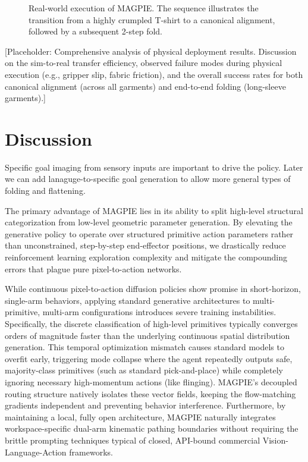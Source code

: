 \documentclass[journal]{IEEEtran}
\begin{document}
\begin{figure}[!h]
    \centering
    \caption{Real-world execution of MAGPIE. The sequence illustrates the transition from a highly crumpled T-shirt to a canonical alignment, followed by a subsequent 2-step fold.}
    \label{fig:real_world}
\end{figure}

[Placeholder: Comprehensive analysis of physical deployment results. Discussion on the sim-to-real transfer efficiency, observed failure modes during physical execution (e.g., gripper slip, fabric friction), and the overall success rates for both canonical alignment (across all garments) and end-to-end folding (long-sleeve garments).]

\section{Discussion}
\label{sec:discussion}

Specific goal imaging from sensory inputs are important to drive the policy. Later we can add lanaguge-to-specific goal generation to allow more general types of folding and flattening.  

The primary advantage of MAGPIE lies in its ability to split high-level structural categorization from low-level geometric parameter generation. By elevating the generative policy to operate over structured primitive action parameters rather than unconstrained, step-by-step end-effector positions, we drastically reduce reinforcement learning exploration complexity and mitigate the compounding errors that plague pure pixel-to-action networks. 

While continuous pixel-to-action diffusion policies \cite{chi2025diffusion} show promise in short-horizon, single-arm behaviors, applying standard generative architectures to multi-primitive, multi-arm configurations introduces severe training instabilities. Specifically, the discrete classification of high-level primitives typically converges orders of magnitude faster than the underlying continuous spatial distribution generation. This temporal optimization mismatch causes standard models to overfit early, triggering mode collapse where the agent repeatedly outputs safe, majority-class primitives (such as standard pick-and-place) while completely ignoring necessary high-momentum actions (like flinging). MAGPIE's decoupled routing structure natively isolates these vector fields, keeping the flow-matching gradients independent and preventing behavior interference. Furthermore, by maintaining a local, fully open architecture, MAGPIE naturally integrates workspace-specific dual-arm kinematic pathing boundaries without requiring the brittle prompting techniques typical of closed, API-bound commercial Vision-Language-Action frameworks.
\end{document}
